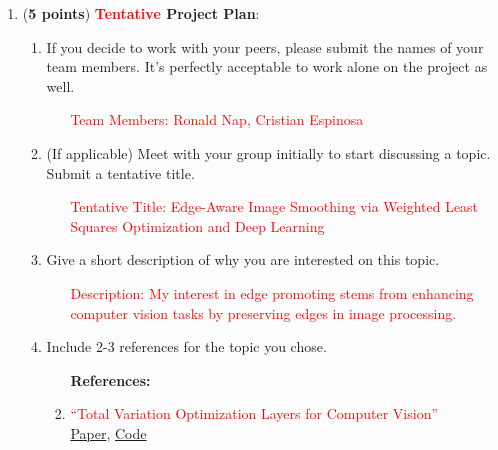 \documentclass[11pt]{article}
\begin{document}
\begin{enumerate}
\item ({\bf 5 points}) {\bf \textcolor{red}{Tentative} Project Plan}:

  \begin{enumerate}
  \item If you decide to work with your peers, please submit the names
    of your team members. It's perfectly acceptable to work alone on
    the project as well.





\begin{enumerate}
    \item[\textcolor{red}{Team Members:}] 
    \textcolor{red}{Ronald Nap, Cristian Espinosa
    }
\end{enumerate}



    
  \item (If applicable) Meet with your group initially to start
    discussing a topic. Submit a tentative title.

\begin{enumerate}
    \item[\textcolor{red}{Tentative Title:}] 
    \textcolor{red}{Edge-Aware Image Smoothing via Weighted Least Squares Optimization and Deep Learning}
\end{enumerate}

    
  \item Give a short description of why you are interested on this
    topic.

\begin{enumerate}
    \item[\textcolor{red}{Description:}] 
    \textcolor{red}{My interest in edge promoting stems from enhancing computer vision tasks by preserving edges in image processing.}
\end{enumerate}


    
  \item Include 2-3 references for the topic you chose.

\begin{enumerate}
    \item[\textbf{References:}]
    
    \item \textcolor{red}{``Total Variation Optimization Layers for Computer Vision''} \\
    \href{https://arxiv.org/pdf/2204.03643.pdf}{Paper}, \href{https://github.com/raymondyeh07/tv_layers_for_cv/tree/main}{Code}


\end{enumerate}
\end{enumerate}
\end{enumerate}
\end{document}
